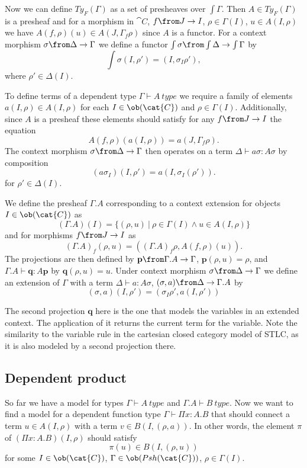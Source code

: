 Now we can define $Ty_F(\Gamma)$ as a set of presheaves over $\int \Gamma$.
Then $A \in Ty_F(\Gamma)$ is a presheaf and for a morphism in $\cat{C}$, $f
\from J \to I$, $\rho \in \Gamma(I)$, $u \in A(I, \rho)$ we have $A(f, \rho)(u)
\in A(J, \Gamma_f \rho)$ since $A$ is a functor. For a context morphism $\sigma
\from \Delta \to \Gamma$ we define a functor $\int \sigma \from \int \Delta \to
\int \Gamma$ by
\[
 \int \sigma (I, \rho') = (I, \sigma_I \rho'),
\]
where $\rho' \in \Delta(I)$.

To define terms of a dependent type $\Gamma \vdash A~type$ we require a family
of elements $a(I, \rho) \in A(I, \rho)$ for each $I \in \ob(\cat{C})$ and $\rho
\in \Gamma(I)$. Additionally, since $A$ is a presheaf these elements should
satisfy for any $f \from J \to I$ the equation
\[
  A(f, \rho)(a(I, \rho)) = a(J, \Gamma_f \rho).
\]
The context morphism $\sigma \from \Delta \to \Gamma$ then operates on a term
$\Delta \vdash a\sigma : A\sigma$ by composition
\[
  (a\sigma_I)(I, \rho') = a(I, \sigma_I(\rho')).
\]
for $\rho' \in \Delta(I)$.

We define the presheaf $\Gamma.A$ corresponding to a context extension for
objects $I \in \ob(\cat{C})$ as
\[
  (\Gamma.A)(I) = \{(\rho, u)~|~\rho \in \Gamma(I) \land u \in A(I, \rho)\}
\]
and for morphisms $f \from J \to I$ as
\[
  (\Gamma.A)_f(\rho, u) = ((\Gamma.A)_f \rho, A(f, \rho)(u)).
\]
The projections are then defined by $\mathbf{p} \from \Gamma.A \to \Gamma$,
$\mathbf{p}(\rho, u) = \rho$, and $\Gamma.A \vdash \mathbf{q} : A\mathbf{p}$ by
$\mathbf{q}(\rho, u) = u$. Under context morphism $\sigma \from \Delta \to
\Gamma$ we define an extension of $\Gamma$ with a term $\Delta \vdash a :
A\sigma$, $(\sigma, a) \from \Delta \to \Gamma.A$ by
\[
  (\sigma, a)(I, \rho') = (\sigma_I \rho', a(I, \rho'))
\]

The second projection $\mathbf{q}$ here is the one that models the variables in
an extended context. The application of it returns the current term for the
variable. Note the similarity to the variable rule in the cartesian closed
category model of STLC, as it is also modeled by a second projection there.

\subsection*{Dependent product}

So far we have a model for types $\Gamma \vdash A~type$ and $\Gamma.A \vdash
B~type$. Now we want to find a model for a dependent function type $\Gamma
\vdash \Pi x:A.B$ that should connect a term $u \in A(I, \rho)$ with a term $v
\in B(I, (\rho, a))$. In other words, the element $\pi$ of $(\Pi x:A.B)(I, \rho)$
should satisfy
\[
  \pi(u) \in B(I, (\rho, u))
\]
for some $I \in \ob(\cat{C})$, $\Gamma \in \ob(Psh(\cat{C}))$, $\rho \in
\Gamma(I)$.

